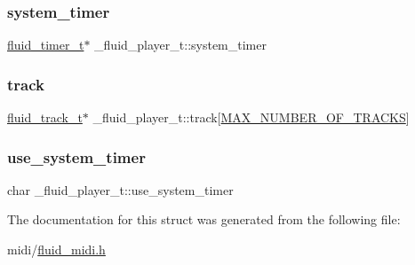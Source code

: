 \mbox{\label{struct__fluid__player__t_a8780acf388964d3d59ad0815df1c699d}} 
\subsubsection{\texorpdfstring{system\+\_\+timer}{system\_timer}}
{\footnotesize\ttfamily \hyperlink{fluid__sys_8h_a520742276ee4ea4bf140e6e6be79e4ae}{fluid\+\_\+timer\+\_\+t}$\ast$ \+\_\+fluid\+\_\+player\+\_\+t\+::system\+\_\+timer}

\mbox{\label{struct__fluid__player__t_abaf5bdaf07e59c4d0fb49f4361f2626d}} 
\subsubsection{\texorpdfstring{track}{track}}
{\footnotesize\ttfamily \hyperlink{fluid__midi_8h_a81a9252c015f2b4173a2642a4507d74b}{fluid\+\_\+track\+\_\+t}$\ast$ \+\_\+fluid\+\_\+player\+\_\+t\+::track\mbox{[}\hyperlink{fluid__midi_8h_a2023050a49b937b6321b5236aac122c9}{M\+A\+X\+\_\+\+N\+U\+M\+B\+E\+R\+\_\+\+O\+F\+\_\+\+T\+R\+A\+C\+KS}\mbox{]}}

\mbox{\label{struct__fluid__player__t_a1f215fdc1f459ac01cae1272ef191d23}} 
\subsubsection{\texorpdfstring{use\+\_\+system\+\_\+timer}{use\_system\_timer}}
{\footnotesize\ttfamily char \+\_\+fluid\+\_\+player\+\_\+t\+::use\+\_\+system\+\_\+timer}



The documentation for this struct was generated from the following file\+:\begin{DoxyCompactItemize}
\item 
midi/\hyperlink{fluid__midi_8h}{fluid\+\_\+midi.\+h}\end{DoxyCompactItemize}
